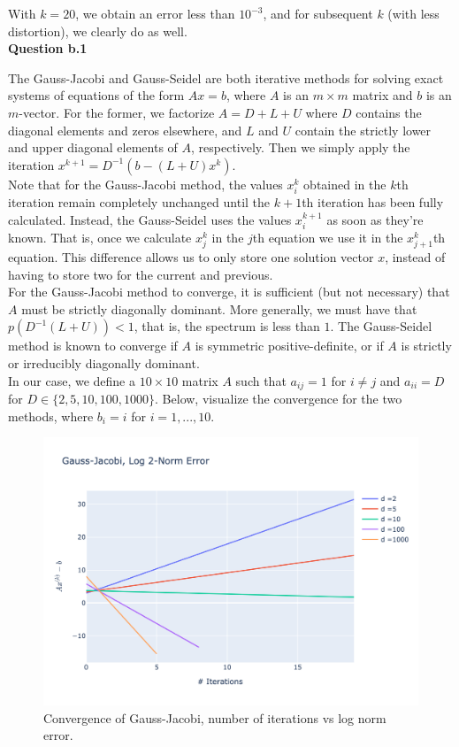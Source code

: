 \documentclass{article}
\begin{document}
With $k=20$, we obtain an error less than $10^{-3}$, and for subsequent $k$ (with less distortion), we clearly do as well. \\

\textbf{Question b.1} 

The Gauss-Jacobi and Gauss-Seidel are both iterative methods for solving exact systems of equations of the form $Ax = b$, where $A$ is an $m \times m$ matrix and $b$ is an $m$-vector. For the former, we factorize $A=D+L+U$ where $D$ contains the diagonal elements and zeros elsewhere, and $L$ and $U$ contain the strictly lower and upper diagonal elements of $A$, respectively. Then we simply apply the iteration $x^{k+1} = D^{-1}\left(b-(L+U)x^{k}\right)$. \\

Note that for the Gauss-Jacobi method, the values $x_i^{k}$ obtained in the $k$th iteration remain completely unchanged until the $k+1$th iteration has been fully calculated. Instead, the Gauss-Seidel uses the values $x_i^{k+1}$ as soon as they're known. That is, once we calculate $x_{j}^k$ in the $j$th equation we use it in the $x_{j+1}^k$th equation. This difference allows us to only store one solution vector $x$, instead of having to store two for the current and previous. \\

For the Gauss-Jacobi method to converge, it is sufficient (but not necessary) that $A$ must be strictly diagonally dominant. More generally, we must have that $p(D^{-1}(L+U)) < 1$, that is, the spectrum is less than $1$. The Gauss-Seidel method is known to converge if $A$ is symmetric positive-definite, or if $A$ is strictly or irreducibly diagonally dominant. \\

In our case, we define a $10 \times 10$ matrix $A$ such that $a_{ij} = 1$ for $i \neq j$ and $a_{ii} = D$ for $D \in \{ 2,5,10,100,1000\}$. Below, visualize the convergence for the two methods, where $b_i = i$ for $i=1,...,10$. 

\begin{figure}[H]
  \centering
  \includegraphics[width=\linewidth]{images/gauss_jacobi_error.png}  
  \caption{Convergence of Gauss-Jacobi, number of iterations vs log norm error.}
\end{figure}
\end{document}
